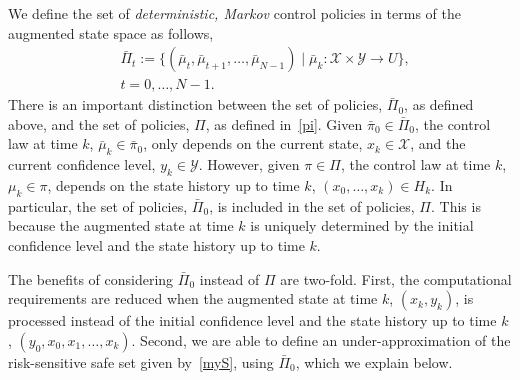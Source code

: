 \documentclass[letterpaper, 10 pt, conference]{ieeeconf}  %
\begin{document}
We define the set of \textit{deterministic, Markov} control policies in terms of the augmented state space as follows,
%
\begin{equation}
\label{augpi}
\begin{aligned}
& \bar{\Pi}_t := \{ (\bar{\mu}_t, \bar{\mu}_{t+1}, \dots, \bar{\mu}_{N-1}) \mid \bar{\mu}_k: \mathcal{X} \times \mathcal{Y} \rightarrow U \},\\
& t = 0, \dots, N-1.
\end{aligned}
\end{equation}
%
There is an important distinction between the set of policies, $\bar{\Pi}_0$, as defined above,
and the set of policies, $\Pi$, as defined in~\eqref{pi}.
Given $\bar{\pi}_0 \in \bar{\Pi}_0$, the control law at time $k$, $\bar{\mu}_k \in \bar{\pi}_0$, 
only depends on the current state, $x_k \in \mathcal{X}$, and the current confidence level, $y_k \in \mathcal{Y}$.
However, given $\pi \in \Pi$, the control law at time $k$, $\mu_k \in \pi$, 
depends on the state history up to time $k$, $(x_0, \dots, x_k) \in H_k$.
In particular, the set of policies, $\bar{\Pi}_0$, is included in the set of policies, $\Pi$.
This is because the augmented state at time $k$ is uniquely determined by the initial confidence level and the state history up to time $k$.\footnotemark 
{}

The benefits of considering $\bar{\Pi}_0$ instead of $\Pi$ are two-fold. 
First, the computational requirements are reduced when the augmented state at time $k$, $(x_k, y_k)$, 
is processed instead of the initial confidence level and the state history up to time $k$, $(y_0, x_0, x_1, \hdots, x_k)$. 
Second, we are able to define an under-approximation
of the risk-sensitive safe set given by~\eqref{myS}, using $\bar{\Pi}_0$, which we explain below.
%
\end{document}
